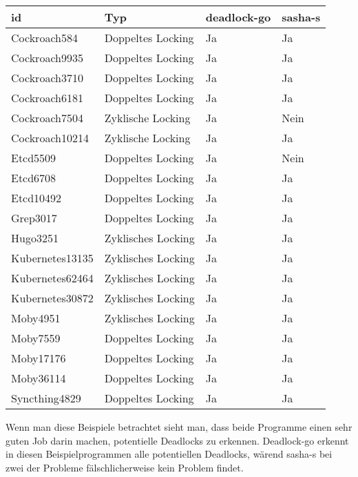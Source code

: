 \begin{table}[H]
\centering
\begin{tabular}{|l|l|l|l|}
\hline
\textbf{id} & \textbf{Typ} & \textbf{deadlock-go} & \textbf{sasha-s} \\ \hline
Cockroach584 & Doppeltes Locking & Ja & Ja \\ \hline
Cockroach9935 & Doppeltes Locking & Ja & Ja \\ \hline
Cockroach3710 & Doppeltes Locking & Ja & Ja \\ \hline
Cockroach6181 & Doppeltes Locking & Ja & Ja \\ \hline
Cockroach7504 & Zyklische Locking & Ja & Nein \\ \hline
Cockroach10214 & Zyklische Locking & Ja & Ja \\ \hline
Etcd5509 & Doppeltes Locking & Ja & Nein \\ \hline
Etcd6708 & Doppeltes Locking & Ja & Ja \\ \hline
Etcd10492 & Doppeltes Locking & Ja & Ja \\ \hline
Grep3017 & Doppeltes Locking & Ja & Ja \\ \hline
Hugo3251 & Zyklisches Locking & Ja & Ja \\ \hline
Kubernetes13135 & Zyklisches Locking & Ja & Ja \\ \hline
Kubernetes62464 & Zyklisches Locking & Ja & Ja \\ \hline
Kubernetes30872 & Zyklisches Locking & Ja & Ja \\ \hline
Moby4951 & Zyklisches Locking & Ja & Ja \\ \hline
Moby7559 & Doppeltes Locking & Ja & Ja \\ \hline
Moby17176 & Doppeltes Locking & Ja & Ja \\ \hline
Moby36114 & Doppeltes Locking & Ja & Ja \\ \hline
Syncthing4829 & Doppeltes Locking & Ja & Ja \\ \hline
\end{tabular}
\end{table}
Wenn man diese Beispiele betrachtet sieht man, dass beide Programme einen
sehr guten Job darin machen, potentielle Deadlocks zu erkennen. 
Deadlock-go erkennt in diesen Beispielprogrammen alle potentiellen
Deadlocks, wärend sasha-s bei zwei der Probleme fälschlicherweise 
kein Problem findet.